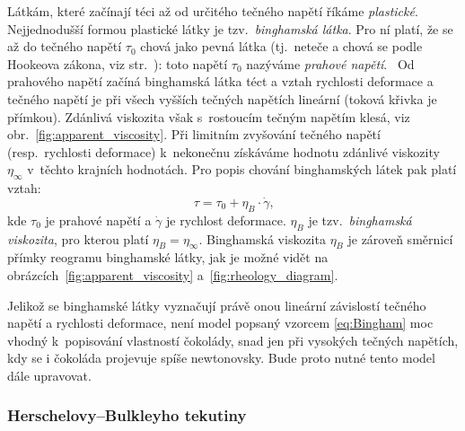 \documentclass[12pt]{article}
\begin{document}
Látkám, které začínají téci až od určitého tečného napětí říkáme \emph{plastické}.~\cite{material:Nenewtonovské_kapaliny}\cite{material:Viskozita_a_povrchove_napeti} Nejjednodušší formou plastické látky je tzv.~\emph{binghamská látka}. Pro ní platí, že se až do tečného napětí $\tau_0$ chová jako pevná látka (tj.~neteče a chová se podle Hookeova zákona, viz str.~\pageref{sec:Hookeův_zákon}): toto napětí $\tau_0$ nazýváme \emph{prahové napětí}.~\cite{wiki:Bingham_plastic}\cite{material:Tokove_chovani_reologicke_modely} Od prahového napětí začíná binghamská látka téct a vztah rychlosti deformace a tečného napětí je při všech vyšších tečných napětích lineární (toková křivka je přímkou). Zdánlivá viskozita však s~rostoucím tečným napětím klesá, viz obr.~\ref{fig:apparent_viscosity}. Při limitním zvyšování tečného napětí (resp.~rychlosti deformace) k~nekonečnu získáváme hodnotu zdánlivé viskozity $\eta_\infty$ v~těchto krajních hodnotách. Pro popis chování binghamských látek pak platí vztah:~\cite{Article:Comparison_of_models_chocolate}\cite{Article:Extended_casson_equation}
\begin{equation}
    \tau = \tau_0 + \eta_B\cdot \dot\gamma\text{,}
    \label{eq:Bingham}
\end{equation}
kde $\tau_0$ je prahové napětí a $\dot\gamma$ je rychlost deformace. $\eta_B$ je tzv.~\emph{binghamská viskozita}, pro kterou platí $\eta_B = \eta_\infty$. Binghamská viskozita $\eta_B$ je zároveň směrnicí přímky reogramu binghamské látky, jak je možné vidět na obrázcích~\ref{fig:apparent_viscosity} a~\ref{fig:rheology_diagram}.
\par\noindent
Jelikož se binghamské látky vyznačují právě onou lineární závislostí tečného napětí a rychlosti deformace, není model popsaný vzorcem \ref{eq:Bingham} moc vhodný k~popisování vlastností čokolády, snad jen při vysokých tečných napětích, kdy se i čokoláda projevuje spíše newtonovsky. Bude proto nutné tento model dále upravovat.

\subsubsection{Herschelovy–Bulkleyho tekutiny}%
\end{document}

